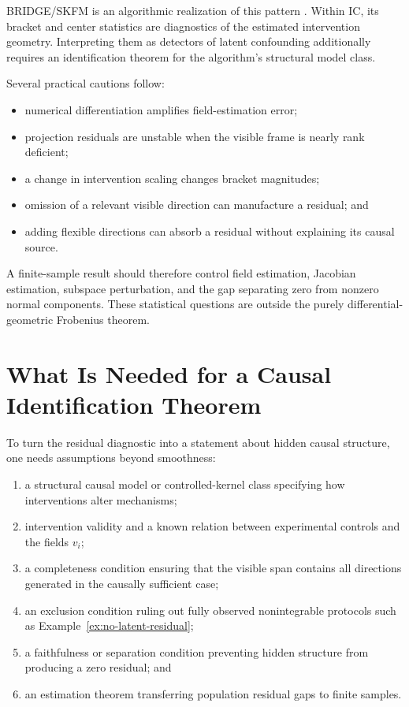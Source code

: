 \documentclass{article}
\theoremstyle{plain}
\theoremstyle{definition}
\theoremstyle{remark}
\newcommand{\IC}{\textsc{IC}}
\begin{document}
BRIDGE/SKFM is an algorithmic realization of this pattern
\citep{mahadevan2026latentconfoundedcausaldiscovery}.  Within \IC, its bracket
and center statistics are diagnostics of the estimated intervention geometry.
Interpreting them as detectors of latent confounding additionally requires an
identification theorem for the algorithm's structural model class.

Several practical cautions follow:
\begin{itemize}[leftmargin=*,itemsep=2pt]
  \item numerical differentiation amplifies field-estimation error;
  \item projection residuals are unstable when the visible frame is nearly
        rank deficient;
  \item a change in intervention scaling changes bracket magnitudes;
  \item omission of a relevant visible direction can manufacture a residual;
        and
  \item adding flexible directions can absorb a residual without explaining
        its causal source.
\end{itemize}

A finite-sample result should therefore control field estimation, Jacobian
estimation, subspace perturbation, and the gap separating zero from nonzero
normal components.  These statistical questions are outside the purely
differential-geometric Frobenius theorem.

\section{What Is Needed for a Causal Identification Theorem}
\label{sec:identification}

To turn the residual diagnostic into a statement about hidden causal structure,
one needs assumptions beyond smoothness:
\begin{enumerate}[leftmargin=*,itemsep=2pt]
  \item a structural causal model or controlled-kernel class specifying how
        interventions alter mechanisms;
  \item intervention validity and a known relation between experimental controls
        and the fields \(v_i\);
  \item a completeness condition ensuring that the visible span contains all
        directions generated in the causally sufficient case;
  \item an exclusion condition ruling out fully observed nonintegrable protocols
        such as Example~\ref{ex:no-latent-residual};
  \item a faithfulness or separation condition preventing hidden structure from
        producing a zero residual; and
  \item an estimation theorem transferring population residual gaps to finite
        samples.
\end{enumerate}
\end{document}
